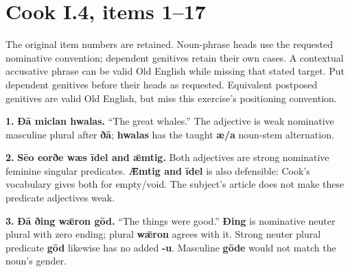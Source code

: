 \section*{Cook I.4, items 1–17}

The original item numbers are retained. Noun-phrase heads use the requested nominative convention; dependent genitives retain their own cases. A contextual accusative phrase can be valid Old English while missing that stated target. Put dependent genitives before their heads as requested. Equivalent postposed genitives are valid Old English, but miss this exercise’s positioning convention.

\par\begin{minipage}{\linewidth}\raggedright
\textbf{1.} \textbf{Ðā miclan hwalas.} “The great whales.” The adjective is weak nominative masculine plural after \textbf{ðā}; \textbf{hwalas} has the taught \textbf{æ/\allowbreak{}a} noun-stem alternation.

\end{minipage}\par\addvspace{4pt}

\par\begin{minipage}{\linewidth}\raggedright
\textbf{2.} \textbf{Sēo eorðe wæs īdel and ǣmtig.} Both adjectives are strong nominative feminine singular predicates. \textbf{Ǣmtig and īdel} is also defensible: Cook’s vocabulary gives both for empty/\allowbreak{}void. The subject’s article does not make these predicate adjectives weak.

\end{minipage}\par\addvspace{4pt}

\par\begin{minipage}{\linewidth}\raggedright
\textbf{3.} \textbf{Ðā ðing wǣron gōd.} “The things were good.” \textbf{Ðing} is nominative neuter plural with zero ending; plural \textbf{wǣron} agrees with it. Strong neuter plural predicate \textbf{gōd} likewise has no added \textbf{-u}. Masculine \textbf{gōde} would not match the noun’s gender.

\end{minipage}\par\addvspace{4pt}


